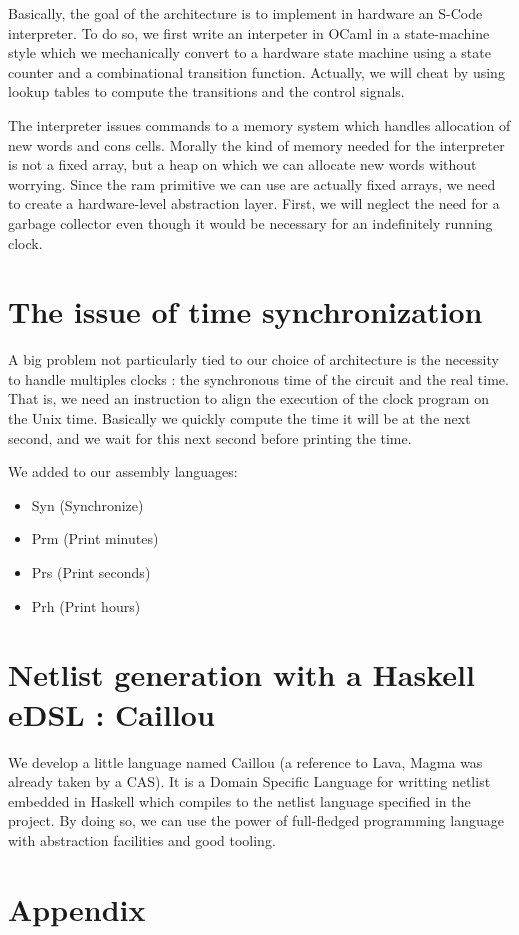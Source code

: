 \documentclass[a4paper, 11pt]{article}
\begin{document}
Basically, the goal of the architecture is to implement in hardware an S-Code
interpreter. To do so, we first write an interpeter in OCaml in a state-machine
style which we mechanically convert to a hardware state machine using a state
counter and a combinational transition function.
Actually, we will cheat by using lookup tables to compute the transitions and
the control signals.

The interpreter issues commands to a memory system which handles allocation of
new words and cons cells. Morally the kind of memory needed for the interpreter
is not a fixed array, but a heap on which we can allocate new words without
worrying. Since the ram primitive we can use are actually fixed arrays, we need
to create a hardware-level abstraction layer. First, we will neglect the need
for a garbage collector even though it would be necessary for an indefinitely
running clock.   


\section{The issue of time synchronization}

A big problem not particularly tied to our choice of architecture is the
necessity to handle multiples clocks : the synchronous time of the circuit and
the real time. That is, we need an instruction to align the execution of the
clock program on the Unix time. Basically we quickly compute the time it will be
at the next second, and we wait for this next second before printing the time.

We added to our assembly languages: 
\begin{itemize}
\item Syn (Synchronize)
\item Prm (Print minutes)
\item Prs (Print seconds)
\item Prh (Print hours)
\end{itemize}

\section{Netlist generation with a Haskell eDSL : Caillou }
We develop a little language named Caillou (a reference to Lava, Magma was
already taken by a CAS). It is a Domain Specific Language for writting netlist
embedded in Haskell which compiles to the netlist language specified in the
project. By doing so, we can use the power of full-fledged programming language
with abstraction facilities and good tooling. 

\section{Appendix}


\end{document}
